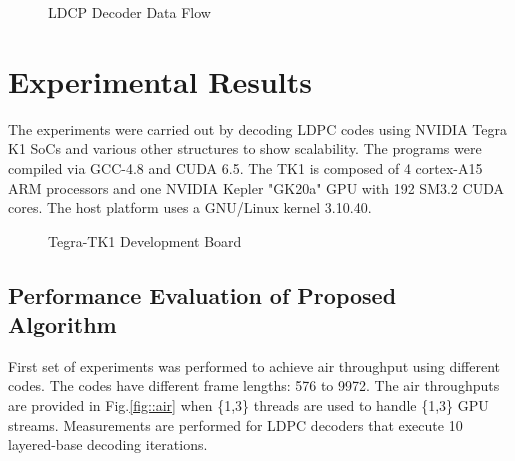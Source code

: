 \documentclass{article}
\begin{document}
\begin{figure}[H]
\begin{centering}
\caption[width=.3\textwidth]{LDCP Decoder Data Flow}
\label{fig_total}
\end{centering}
\end{figure}

\section{Experimental Results} \label{sec4}

The experiments were carried out by decoding LDPC codes using NVIDIA Tegra K1 SoCs and various other structures to show scalability. The programs were compiled via GCC-4.8 and CUDA 6.5. The TK1 is composed of 4 cortex-A15 ARM processors and one NVIDIA Kepler "GK20a" GPU with 192 SM3.2 CUDA cores. The host platform uses a GNU/Linux kernel 3.10.40.

\begin{figure}[H]
\begin{centering}
\caption[width=.3\textwidth]{Tegra-TK1 Development Board}
\label{tegra}
\end{centering}
\end{figure}

\subsection{Performance Evaluation of Proposed Algorithm} 
First set of experiments was performed to achieve air throughput using different codes. The codes have different frame lengths: 576 to 9972. The air throughputs are provided in Fig.\ref{fig::air} when \{1,3\} threads are used to handle \{1,3\} GPU streams. Measurements are performed for LDPC decoders that execute 10 layered-base decoding iterations.
\end{document}
